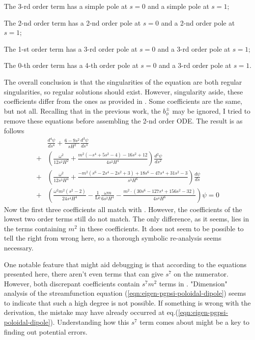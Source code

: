 The 3-rd order term has a simple pole at $s=0$ and a simple pole at $s=1$;

The 2-nd order term has a 2-nd order pole at $s=0$ and a 2-nd order pole at $s=1$;

The 1-st order term has a 3-rd order pole at $s=0$ and a 3-rd order pole at $s=1$;

The 0-th order term has a 4-th order pole at $s=0$ and a 3-rd order pole at $s=1$.

The overall conclusion is that the singularities of the equation are both regular singularities, so regular solutions should exist.
However, singularity aside, these coefficients differ from the ones as provided in \textcite{holdenried-chernoff_long_2021}. Some coefficients are the same, but not all. Recalling that in the previous work, the $b_\phi^{\pm}$ may be ignored, I tried to remove these equations before assembling the 2-nd order ODE. The result is as follows
\begin{equation}
\begin{aligned}
    &\frac{d^{4}\psi}{d s^{4}} + \frac{6 - 9 s^{2}}{sH^{2}} \frac{d^{3}\psi}{d s^{3}} \\
    +& \left(\frac{\omega^{2}}{12 s^{2} H^{2}} + \frac{m^{2} \left(- s^{4} + 5 s^{2} - 4\right) - 16 s^{2} + 12}{4 s^{2} H^{4}}\right) \frac{d^{2}\psi}{d s^{2}} \\
    +& \left(\frac{\omega^{2}}{12 s^{3} H^{4}} + \frac{- m^{2} \left(s^{6} - 2 s^{4} - 2 s^{2} + 3\right) + 18 s^{6} - 47 s^{4} + 31 s^{2} - 3}{s^{3} H^{6}}\right) \frac{d\psi}{d s} \\
    +& \left(\frac{\omega^{2} m^{2} \left(s^2 - 2\right)}{24 s^{4} H^{4}} - \frac{1}{\mathrm{Le}} \frac{\omega m}{6 s^{2} H^{4}} - \frac{m^{2} \cdot \left(30 s^{6} - 127 s^{4} + 156 s^{2} - 32\right)}{4 s^{4} H^{6}}\right) \psi = 0
\end{aligned}
\end{equation}
Now the first three coefficients all match with \textcite{holdenried-chernoff_long_2021}. However, the coefficients of the lowest two order terms still do not match. The only difference, as it seems, lies in the terms containing $m^2$ in these coefficients.
It does not seem to be possible to tell the right from wrong here, so a thorough symbolic re-analysis seems necessary.

One notable feature that might aid debugging is that according to the equations presented here, there aren't even terms that can give $s^7$ on the numerator. However, both discrepant coefficients contain $s^7m^2$ terms in \textcite{holdenried-chernoff_long_2021}. "Dimension" analysis of the streamfunction equation (\ref{eqn:eigen-pgpsi-poloidal-dipole}) seems to indicate that such a high degree is not possible. If something is wrong with the derivation, the mistake may have already occurred at eq.(\ref{eqn:eigen-pgpsi-poloidal-dipole}). Understanding how this $s^7$ term comes about might be a key to finding out potential errors.

\clearpage
